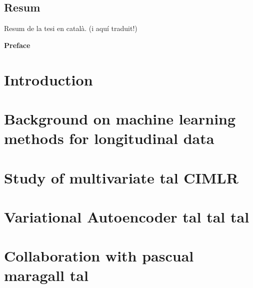 \documentclass[12pt, b5paper,twoside]{tesi_upf}
\begin{document}
\vspace*{\fill}
\section*{\Large \sffamily  Resum}
Resum de la tesi en català. (i aquí traduit!)
\vspace*{\fill}

\cleardoublepage

{\bf Preface} %

\cleardoublepage

\tableofcontents

\listoffigures

\listoftables

\mainmatter

\chapter{Introduction}


\chapter{Background on machine learning methods for longitudinal data}


\chapter{Study of multivariate tal CIMLR}



\chapter{Variational Autoencoder tal tal tal}


\chapter{Collaboration with pascual maragall tal}

\end{document}
